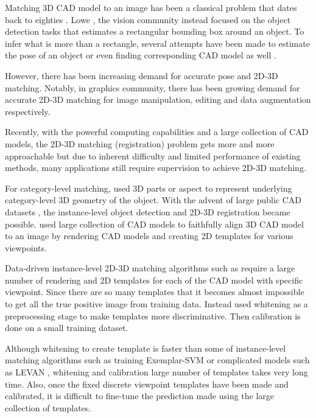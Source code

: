 Matching 3D CAD model to an image has been a classical problem that dates back to eighties \cite{Lowe87}. Lowe \etal , the vision community instead focused on the object detection tasks that estimates a rectangular bounding box around an object\cite{Felzenszwalb10, Girshick14}. To infer what is more than a rectangle, several attempts have been made to estimate the pose of an object \cite{Xiang12, Pepik12, Fidler12, Hejrati14} or even finding corresponding CAD model as well \cite{Aubry14, Lim14}. 

However, there has been increasing demand for accurate pose and 2D-3D matching. Notably, in graphics community, there has been growing demand for accurate 2D-3D matching \cite{Kholgade14, Chen13, Kostas14} for image manipulation, editing and data augmentation respectively. 

Recently, with the powerful computing capabilities and a large collection of CAD models, the 2D-3D matching (registration) problem gets more and more approachable but due to inherent difficulty and limited performance of existing methods, many applications still require supervision to achieve 2D-3D matching.


For category-level matching, \cite{Xiang12, Hejrati14, Pepik12} used 3D parts or aspect to represent underlying category-level 3D geometry of the object. With the advent of large public CAD datasets \cite{Trimble, Yobi}, the instance-level object detection and 2D-3D registration became possible. \cite{Aubry14, Lim14} used large collection of CAD models to faithfully align 3D CAD model to an image by rendering CAD models and creating 2D templates for various viewpoints.

Data-driven instance-level 2D-3D matching algorithms such as \cite{Aubry14, Lim14} require a large number of rendering and 2D templates for each of the CAD model with specific viewpoint. Since there are so many templates that it becomes almost impossible to get all the true positive image from training data. Instead \cite{Aubry14, Lim14} used whitening as a preprocessing stage \cite{Hariharan12} to make templates more discriminative. Then calibration is done on a small training dataset.

Although whitening to create template is faster than some of instance-level matching algorithms such as training Exemplar-SVM \cite{Malisiewicz11} or complicated models such as LEVAN \cite{Divvala14}, whitening and calibration large number of templates takes very long time. Also, once the fixed discrete viewpoint templates have been made and calibrated, it is difficult to fine-tune the prediction made using the large collection of templates.

